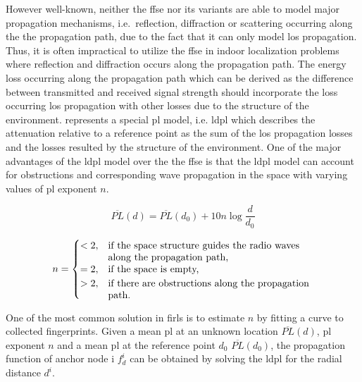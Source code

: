     However well-known, neither the \gls{ffse} nor its variants are able to model major propagation mechanisms, i.e.\ reflection, diffraction or scattering occurring along the the propagation path, due to the fact that it can only model \gls{los} propagation.
    Thus, it is often impractical to utilize the \gls{ffse} in indoor localization problems where reflection and diffraction occurs along the propagation path.
    The energy loss occurring along the propagation path which can be derived as the difference between transmitted and received signal strength should incorporate the loss occurring \gls{los} propagation with other losses due to the structure of the environment.
     represents a special \gls{pl} model, i.e. \gls{ldpl} which describes the attenuation relative to a reference point as the sum of the \gls{los} propagation losses and the losses resulted by the structure of the environment.
    One of the major advantages of the \gls{ldpl} model over the the \gls{ffse} is that the \gls{ldpl} model can account for obstructions and corresponding wave propagation in the space with varying values of \gls{pl} exponent $n$.


    \begin{equation}
        \label{eq:log-distance}
        \overline{PL}(d) = \overline{PL}(d_0) + 10 n \log{\dfrac{d}{d_0}}
    \end{equation}

    \begin{equation}
        n =
        \begin{cases}
            <2,& \parbox[t]{.6\textwidth}{if the space structure guides the radio waves\\
                                        along the propagation path,} \\
            =2,& \text{if the space is empty,} \\
            >2,& \parbox[t]{.6\textwidth}{if there are obstructions along the propagation\\
                                        path.}
        \end{cases}
    \end{equation}

    One of the most common solution in \gls{firl}s is to estimate $n$ by fitting a curve to collected fingerprints.
    Given a mean \gls{pl} at an unknown location $\overline{PL}(d)$, \gls{pl} exponent $n$ and a mean \gls{pl} at the reference point $d_0$ $\overline{PL}(d_0)$, the propagation function of anchor node i $f^i_{d}$ can be obtained by solving the \gls{ldpl} for the radial distance $d^i$.

